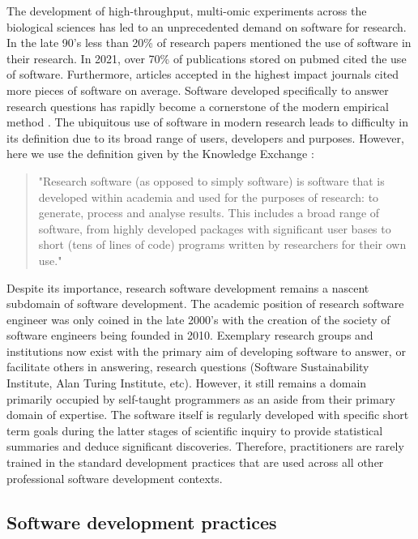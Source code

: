 \documentclass[../main.tex]{subfiles}
\begin{document}
The development of high-throughput, multi-omic experiments across the biological sciences has led to an unprecedented demand on software for research.
In the late 90's less than 20\% of research papers mentioned the use of software in their research. 
In 2021, over 70\% of publications stored on pubmed cited the use of software.
Furthermore, articles accepted in the highest impact journals cited more pieces of software on average.
Software developed specifically to answer research questions has rapidly become a cornerstone of the modern empirical method \parencite{Schindler2022}.
The ubiquitous use of software in modern research leads to difficulty in its definition due to its broad range of users, developers and purposes.
However, here we use the definition given by the Knowledge Exchange \parencite{KL2016}:
 
\begin{quote}
"Research software (as opposed to simply software) is software that is developed within academia and used for the purposes of research: to generate, process and analyse results.
This includes a broad range of software, from highly developed packages with significant user bases to short (tens of lines of code) programs written by researchers for their own use."
\end{quote}

Despite its importance, research software development remains a nascent subdomain of software development. 
The academic position of research software engineer was only coined in the late 2000's \parencite{Prause2010} with the creation of the society of software engineers being founded in 2010. 
Exemplary research groups and institutions now exist with the primary aim of developing software to answer, or facilitate others in answering, research questions (Software Sustainability Institute, Alan Turing Institute, etc). 
However, it still remains a domain primarily occupied by self-taught programmers as an aside from their primary domain of expertise. 
The software itself is regularly developed with specific short term goals during the latter stages of scientific inquiry to provide statistical summaries and deduce significant discoveries. 
Therefore, practitioners are rarely trained in the standard development practices that are used across all other professional software development contexts.

\subsection{Software development practices}
\end{document}
